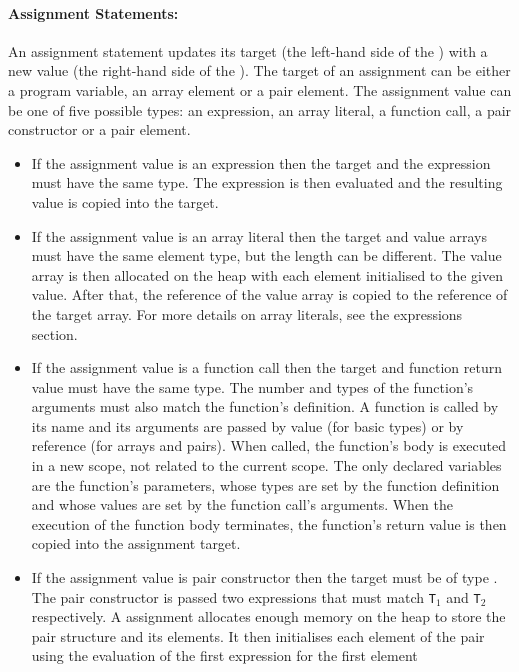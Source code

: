 \documentclass[a4paper]{article}
\theoremstyle{definition}
\begin{document}
\paragraph{Assignment Statements:}
An assignment statement updates its target (the left-hand side of the \lit{=}) with a new value (the right-hand side of the \lit{=}).
The target of an assignment can be either a program variable, an array element or a pair element.
The assignment value can be one of five possible types: an expression, an array literal, a function call, a pair constructor or a pair element.
\begin{itemize}
 \item If the assignment value is an expression  then
       the target and the expression must have the same type.
       The expression is then evaluated and the resulting value is copied into the target.
 \item If the assignment value is an array literal  then the target and value arrays must have the same element type,
       but the length can be different.
       The value array is then allocated on the heap with each element initialised to the given value. After that, the reference of the value array is copied to the reference of the target array.
       For more details on array literals, see the expressions section.
 \item If the assignment value is a function call  then the target and function return value must have the same type.
       The number and types of the function's arguments must also match the function's definition.
       A function is called by its name and its arguments are passed by value (for basic types) or by reference (for arrays and pairs).
       When called, the function's body is executed in a new scope, not related to the current scope.
       The only declared variables are the function's parameters, whose types are set by the function definition and whose values are set by the function call's arguments.
       When the execution of the function body terminates, the function's return value is then copied into the assignment target.
 \item If the assignment value is pair constructor  then the target must be of type .
       The pair constructor is passed two expressions that must match {\tt T}$_1$ and {\tt T}$_2$ respectively.
       A  assignment allocates enough memory on the heap to store the pair structure and its elements.
       It then initialises each element of the pair using the evaluation of the first expression for the first element

\end{itemize}
\end{document}
